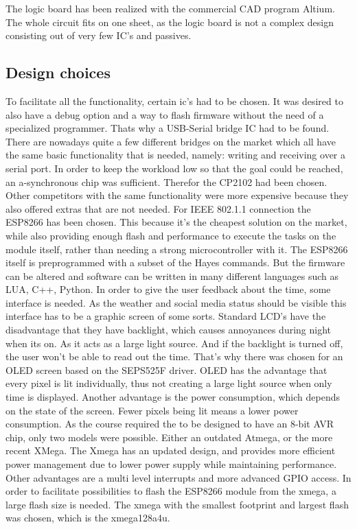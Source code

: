 The logic board has been realized with the commercial CAD program Altium. The whole circuit fits on one sheet, as the logic board is not a complex design consisting out of very few IC's and passives. 
\subsection{Design choices}
To facilitate all the functionality, certain ic's had to be chosen. It was desired to also have a debug option and a way to flash firmware without the need of a specialized programmer. Thats why a USB-Serial bridge IC had to be found. There are nowadays quite a few different bridges on the market which all have the same basic functionality that is needed, namely: writing and receiving over a serial port. In order to keep the workload low so that the goal could be reached, an a-synchronous chip was sufficient. Therefor the CP2102 had been chosen. Other competitors with the same functionality were more expensive because they also offered extras that are not needed.\newpar
For IEEE 802.1.1 connection the ESP8266 has been chosen. This because it's the cheapest solution on the market, while also providing enough flash and performance to execute the tasks on the module itself, rather than needing a strong microcontroller with it. The ESP8266 itself is preprogrammed with a subset of the Hayes commands. But the firmware can be altered and software can be written in many different languages such as LUA, C++, Python.\newpar
In order to give the user feedback about the time, some interface is needed. As the weather and social media status should be visible this interface has to be a graphic screen of some sorts. Standard LCD's have the disadvantage that they have backlight, which causes annoyances during night when its on. As it acts as a large light source. And if the backlight is turned off, the user won't be able to read out the time. That's why there was chosen for an OLED screen based on the SEPS525F driver. OLED has the advantage that every pixel is lit individually, thus not creating a large light source when only time is displayed. Another advantage is the power consumption, which depends on the state of the screen. Fewer pixels being lit means a lower power consumption. \newpar
As the course required the to be designed to have an 8-bit AVR chip, only two models were possible. Either an outdated Atmega, or the more recent XMega. The Xmega has an updated design, and provides more efficient power management due to lower power supply while maintaining performance. Other advantages are a multi level interrupts and more advanced GPIO access. In order to facilitate possibilities to flash the ESP8266 module from the xmega, a large flash size is needed. The xmega with the smallest footprint and largest flash was chosen, which is the xmega128a4u.
